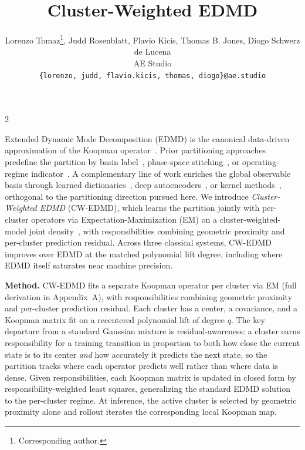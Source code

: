 \documentclass{article}
\title{Cluster-Weighted EDMD}
\date{}
\author{%
	Lorenzo Tomaz\thanks{Corresponding author.}, Judd Rosenblatt, Flavio Kicis, Thomas B. Jones, Diogo Schwerz de Lucena \\
	AE Studio \\
	\texttt{\{lorenzo, judd, flavio.kicis, thomas, diogo\}@ae.studio}
}
\begin{document}
\maketitle


\begin{multicols}{2}

Extended Dynamic Mode Decomposition (EDMD) is the canonical data-driven approximation of the Koopman operator~\citep{williams2015edmd,mezic2005spectral,brunton2022modern,korda2018mpc,mauroy2020koopman}. Prior partitioning approaches predefine the partition by basin label~\citep{williams2015edmd}, phase-space stitching~\citep{sinha2020phase}, or operating-regime indicator~\citep{peitz2019switched}. A complementary line of work enriches the global observable basis through learned dictionaries~\citep{li2017dictionary}, deep autoencoders~\citep{lusch2018deep}, or kernel methods~\citep{williams2015kernel}, orthogonal to the partitioning direction pursued here. We introduce \emph{Cluster-Weighted EDMD} (CW-EDMD), which learns the partition jointly with per-cluster operators via Expectation-Maximization (EM) on a cluster-weighted-model joint density~\citep{gershenfeld1999nature,ingrassia2014linear,punzo2014polynomial}, with responsibilities combining geometric proximity and per-cluster prediction residual. Across three classical systems, CW-EDMD improves over EDMD at the matched polynomial lift degree, including where EDMD itself saturates near machine precision.

\noindent\textbf{Method.} CW-EDMD fits a separate Koopman operator per cluster via EM (full derivation in Appendix~A),
with responsibilities combining geometric proximity and per-cluster prediction residual.
Each cluster has a center, a covariance, and a Koopman matrix fit on a recentered
polynomial lift of degree $q$. The key departure from a standard Gaussian mixture is
residual-awareness: a cluster earns responsibility for a training transition in proportion
to both how close the current state is to its center \emph{and} how accurately it predicts
the next state, so the partition tracks where each operator predicts well rather than where
data is dense. Given responsibilities, each Koopman matrix is updated in closed form by
responsibility-weighted least squares, generalizing the standard EDMD solution to the
per-cluster regime. At inference, the active cluster is selected by geometric proximity
alone and rollout iterates the corresponding local Koopman map. 


\end{multicols}
\end{document}
